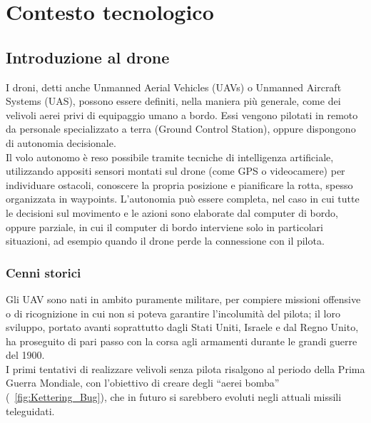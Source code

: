 
\chapter{Contesto tecnologico}

\ifpdf
    \graphicspath{{Chapter2/Figs/Raster/}{Chapter2/Figs/PDF/}{Chapter2/Figs/}}
\else
    \graphicspath{{Chapter2/Figs/Vector/}{Chapter2/Figs/}}
\fi


\section[Introduzione al drone]{Introduzione al drone}

I droni, detti anche Unmanned Aerial Vehicles (UAVs) o Unmanned Aircraft Systems (UAS), possono essere definiti, nella maniera più generale, come dei velivoli aerei privi di equipaggio umano a bordo. Essi vengono pilotati in remoto da personale specializzato a terra (Ground Control Station), oppure dispongono di autonomia decisionale. \\
Il volo autonomo è reso possibile tramite tecniche di intelligenza artificiale, utilizzando appositi sensori montati sul drone (come GPS o videocamere) per individuare ostacoli, conoscere la propria posizione e pianificare la rotta, spesso organizzata in waypoints. 
L'autonomia può essere completa, nel caso in cui tutte le decisioni sul movimento e le azioni sono elaborate dal computer di bordo, oppure parziale, in cui il computer di bordo interviene solo in particolari situazioni, ad esempio quando il drone perde la connessione con il pilota. \\

\subsection[Cenni storici]{Cenni storici}
Gli UAV sono nati in ambito puramente militare, per compiere missioni offensive o di ricognizione in cui non si poteva garantire l'incolumità del pilota; il loro sviluppo, portato avanti soprattutto dagli Stati Uniti, Israele e dal Regno Unito, ha proseguito di pari passo con la corsa agli armamenti durante le grandi guerre del 1900. \\
I primi tentativi di realizzare velivoli senza pilota risalgono al periodo della Prima Guerra Mondiale, con l'obiettivo di creare degli “aerei bomba” (\figurename\ \ref{fig:Kettering_Bug}), che in futuro si sarebbero evoluti negli attuali missili teleguidati. 


